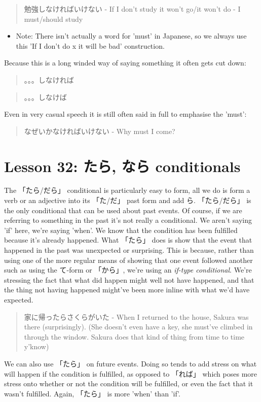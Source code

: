 \documentclass[11pt]{article}
\begin{document}
\begin{quote}
勉強しなければいけない - If I don't study it won't go/it won't do - I must/should study
\end{quote}
\begin{itemize}
\item Note: There isn't actually a word for 'must' in Japanese, so we always use this 'If I don't do x it will be bad' construction.
\end{itemize}

Because this is a long winded way of saying something it often gets cut down:
\begin{quote}
。。。しなければ
\end{quote}
\begin{quote}
。。。しなけば
\end{quote}
Even in very casual speech it is still often said in full to emphasise the 'must':
\begin{quote}
なぜいかなければいけない - Why must I come?
\end{quote}
\section{Lesson 32: たら, なら conditionals}
\label{sec:org8bdd847}
The 「たら/だら」 conditional is particularly easy to form, all we do is form a verb or an adjective into its 「た/だ」 past form and add ら. 「たら/だら」 is the only conditional that can be used about past events. Of course, if we are referring to something in the past it's not really a conditional. We aren't saying 'if' here, we're saying 'when'. We know that the condition has been fulfilled because it's already happened. What 「たら」 does is show that the event that happened in the past was unexpected or surprising. This is because, rather than using one of the more regular means of showing that one event followed another such as using the て-form or 「から」, we're using an \emph{if-type conditional}. We're stressing the fact that what did happen might well not have happened, and that the thing not having happened might've been more inline with what we'd have expected.
\begin{quote}
家に帰ったらさくらがいた - When I returned to the house, Sakura was there (surprisingly). (She doesn't even have a key, she must've climbed in through the window. Sakura does that kind of thing from time to time y'know)
\end{quote}

We can also use 「たら」 on future events. Doing so tends to add stress on what will happen if the condition is fulfilled, as opposed to 「れば」 which poses more stress onto whether or not the condition will be fulfilled, or even the fact that it wasn't fulfilled. Again, 「たら」 is more 'when' than 'if'.
\end{document}
